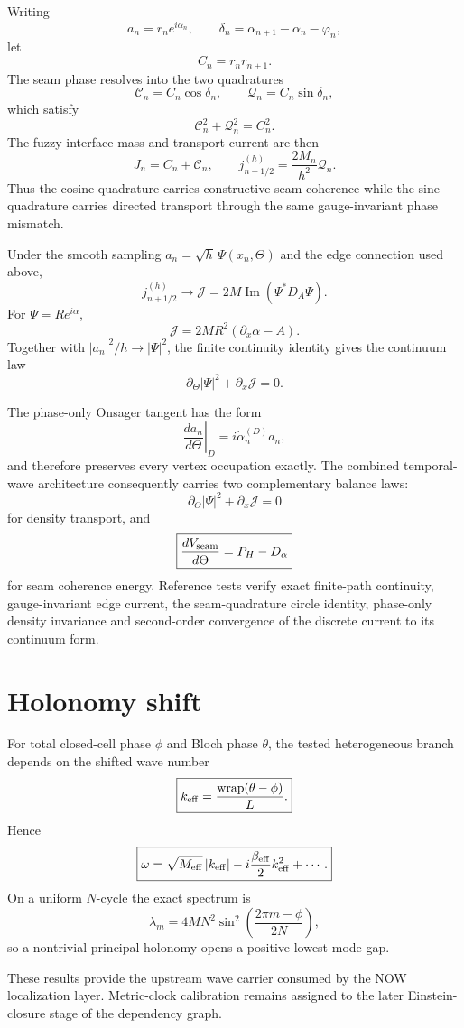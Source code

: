 Writing
\[
a_n=r_ne^{i\alpha_n},
\qquad
\delta_n=\alpha_{n+1}-\alpha_n-\varphi_n,
\]
let
\[
C_n=r_nr_{n+1}.
\]
The seam phase resolves into the two quadratures
\[
\boxed{
\mathcal C_n=C_n\cos\delta_n,
\qquad
\mathcal Q_n=C_n\sin\delta_n,
}
\]
which satisfy
\[
\boxed{
\mathcal C_n^2+\mathcal Q_n^2=C_n^2.
}
\]
The fuzzy-interface mass and transport current are then
\[
\boxed{
J_n=C_n+\mathcal C_n,
\qquad
j_{n+1/2}^{(h)}=\frac{2M_n}{h^2}\mathcal Q_n.
}
\]
Thus the cosine quadrature carries constructive seam coherence while the sine quadrature carries directed transport through the same gauge-invariant phase mismatch.

Under the smooth sampling $a_n=\sqrt h\,\Psi(x_n,\Theta)$ and the edge connection used above,
\[
\boxed{
j_{n+1/2}^{(h)}
\longrightarrow
\mathcal J
=2M\operatorname{Im}(\Psi^*D_A\Psi).
}
\]
For $\Psi=Re^{i\alpha}$,
\[
\boxed{
\mathcal J
=2MR^2(\partial_x\alpha-A).
}
\]
Together with $|a_n|^2/h\to|\Psi|^2$, the finite continuity identity gives the continuum law
\[
\boxed{
\partial_\Theta|\Psi|^2+\partial_x\mathcal J=0.
}
\]

The phase-only Onsager tangent has the form
\[
\left.\frac{da_n}{d\Theta}\right|_D
=i\dot\alpha_n^{(D)}a_n,
\]
and therefore preserves every vertex occupation exactly.  The combined temporal-wave architecture consequently carries two complementary balance laws:
\[
\boxed{
\partial_\Theta|\Psi|^2+\partial_x\mathcal J=0
}
\]
for density transport, and
\[
\boxed{
\frac{dV_{\rm seam}}{d\Theta}=P_H-D_\alpha
}
\]
for seam coherence energy.  Reference tests verify exact finite-path continuity, gauge-invariant edge current, the seam-quadrature circle identity, phase-only density invariance and second-order convergence of the discrete current to its continuum form.

\section{Holonomy shift}

For total closed-cell phase $\phi$ and Bloch phase $\theta$, the tested heterogeneous branch depends on the shifted wave number
\[
\boxed{
k_{\rm eff}=\frac{\operatorname{wrap}(\theta-\phi)}{L}.
}
\]
Hence
\[
\boxed{
\omega
=\sqrt{M_{\rm eff}}\,|k_{\rm eff}|
-i\frac{\beta_{\rm eff}}2k_{\rm eff}^2+\cdots.
}
\]
On a uniform $N$-cycle the exact spectrum is
\[
\lambda_m
=4MN^2
\sin^2\!\left(\frac{2\pi m-\phi}{2N}\right),
\]
so a nontrivial principal holonomy opens a positive lowest-mode gap.

These results provide the upstream wave carrier consumed by the NOW localization layer.  Metric-clock calibration remains assigned to the later Einstein-closure stage of the dependency graph.
